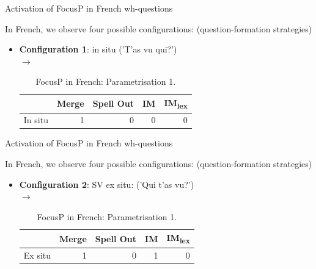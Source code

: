 \documentclass[lesson_slides]{subfiles}
\begin{document}
\begin{frame}[c]{Activation of FocusP in French wh-questions}

    In French, we observe four possible configurations: \pause (question-formation strategies) \pause
    \begin{itemize}
        \item[\ding{227}] \textbf{Configuration 1}: \pause in situ \pause ('T'as vu qui?')\\ \pause
        $\longrightarrow$  \pause
    \vspace*{2mm}
    \begin{table}[H]
    \centering
        \begin{tabular}{|l|r|r|r|r|}
        \hline
         & Merge & Spell Out & IM & IM\textsubscript{lex} \\
        \hline
        In situ & 1 & 0 & 0 & 0 \\
        \hline
        \end{tabular}
    \caption{\label{tab:samp}FocusP in French: Parametrisation 1.}
    \end{table}
    \end{itemize}

\end{frame}
\begin{frame}[c]{Activation of FocusP in French wh-questions}

    In French, we observe four possible configurations: (question-formation strategies)
    \begin{itemize}
        \item[\ding{227}] \textbf{Configuration 2}: \pause SV ex situ: \pause ('Qui t'as vu?')\\ \pause
        $\longrightarrow$  \pause
    \vspace*{2mm}
    \begin{table}[H]
    \centering
        \begin{tabular}{|l|r|r|r|r|}
        \hline
         & Merge & Spell Out & IM & IM\textsubscript{lex} \\
        \hline
        Ex situ & 1 & 0 & 1 & 0 \\
        \hline
        \end{tabular}
    \caption{\label{tab:samp}FocusP in French: Parametrisation 1.}
    \end{table}
    \end{itemize}

\end{frame}
\end{document}
